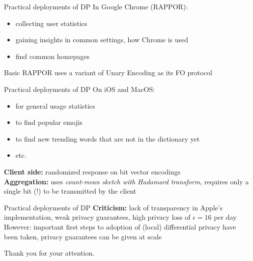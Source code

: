 \documentclass[aspectratio=43]{beamer}
\begin{document}

\begin{frame}{Practical deployments of DP}
    In Google Chrome (RAPPOR):\\
    \bigskip
    \begin{itemize}
        \item collecting user statistics
        \item gaining insights in common settings, how Chrome is used
        \item find common homepages
    \end{itemize}
    \bigskip
    Basic RAPPOR uses a variant of Unary Encoding as its FO protocol
\end{frame}


\begin{frame}{Practical deployments of DP}
    On iOS and MacOS:\\
    \bigskip
    \begin{itemize}
        \item for general usage statistics
        \item to find popular emojis
        \item to find new trending words that are not in the dictionary yet
        \item etc. 
    \end{itemize}
    \bigskip
    \textbf{Client side:} randomized response on bit vector encodings\\
    \bigskip
    \textbf{Aggregation:} uses \emph{count-mean sketch with Hadamard transform}, requires only a single bit (!) to be transmitted by the client
\end{frame}


\begin{frame}{Practical deployments of DP}
    \textbf{Criticism:} lack of transparency in Apple's implementation, weak privacy guarantees, high privacy loss of $\epsilon = 16$ per day\\
    \bigskip
    However: important first steps to adoption of (local) differential privacy have been taken, privacy guarantees can be given at scale
\end{frame}

\begin{frame}[plain]
\begin{center}
   Thank you for your attention. 
\end{center}
\end{frame}
\end{document}
